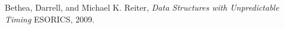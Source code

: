 \documentclass[11pt,twocolumn]{article}
\begin{document}
\pagebreak

\begin{thebibliography}{9}
	
	Bethea, Darrell, and Michael K. Reiter,
	\emph{Data Structures with Unpredictable Timing}
	ESORICS,
	2009.
	
\end{thebibliography}
\end{document}
